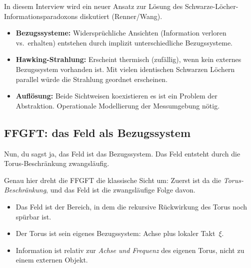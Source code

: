 \documentclass[11pt,a4paper]{article}
\begin{document}
\begin{geminibox}
In diesem Interview wird ein neuer Ansatz zur L\"osung des Schwarze-L\"ocher-Informationsparadoxons diskutiert (Renner/Wang).

\begin{itemize}[leftmargin=1.2em]
  \item \textbf{Bezugssysteme:} Widerspr\"uchliche Ansichten (Information verloren vs.\ erhalten) entstehen durch implizit unterschiedliche Bezugssysteme.
  \item \textbf{Hawking-Strahlung:} Erscheint thermisch (zuf\"allig), wenn kein externes Bezugssystem vorhanden ist. Mit vielen identischen Schwarzen L\"ochern parallel w\"urde die Strahlung geordnet erscheinen.
  \item \textbf{Aufl\"osung:} Beide Sichtweisen koexistieren \textendash{} es ist ein Problem der Abstraktion. Operationale Modellierung der Messumgebung n\"otig.
\end{itemize}
\end{geminibox}

\subsection{FFGFT: das Feld als Bezugssystem}

\begin{userbox}
Nun, du sagst ja, das Feld ist das Bezugssystem. Das Feld entsteht durch die Torus-Beschr\"ankung zwangsl\"aufig.
\end{userbox}

\begin{geminibox}
Genau hier dreht die FFGFT die klassische Sicht um: Zuerst ist da die \emph{Torus-Beschr\"ankung}, und das Feld ist die zwangsl\"aufige Folge davon.

\begin{itemize}[leftmargin=1.2em]
  \item Das Feld ist der Bereich, in dem die rekursive R\"uckwirkung des Torus noch sp\"urbar ist.
  \item Der Torus ist sein eigenes Bezugssystem: Achse plus lokaler Takt~$\xi$.
  \item Information ist relativ zur \emph{Achse und Frequenz} des eigenen Torus, nicht zu einem externen Objekt.
\end{itemize}
\end{geminibox}
\end{document}
